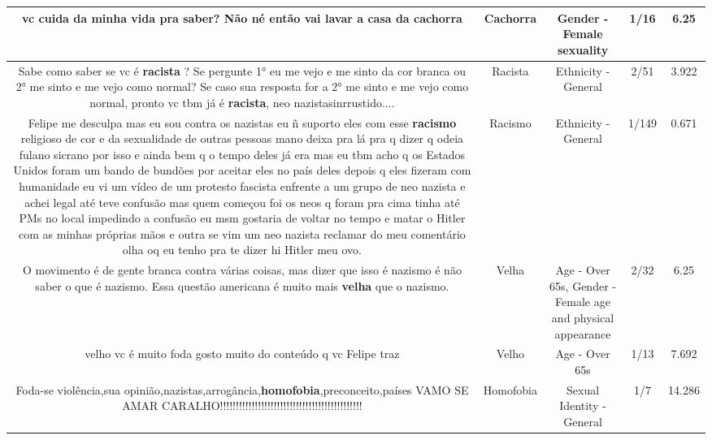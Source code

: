 \documentclass[11pt]{article}
\newlength\mylength
\begin{document}
\begin{center}
\begin{longtable}{|C{.65\mylength}|C{.30\mylength}|C{.12\mylength}|C{.12\mylength}|C{.12\mylength}|}
  \small vc cuida da minha vida pra saber? Não né então vai lavar a casa da cachorra\normalsize   & Cachorra & Gender - Female sexuality & 1/16 & 6.25 \\  \hline
  \small Sabe como saber se vc é \textbf{racista} ? Se pergunte 1° eu me vejo e me sinto da cor branca ou 2° me sinto e me vejo como normal? Se caso sua resposta for a 2° me sinto e me vejo como normal, pronto vc tbm já é \textbf{racista}, neo nazistasinrrustido....\normalsize   & Racista & Ethnicity - General & 2/51 & 3.922 \\  \hline
  \small Felipe me desculpa mas eu sou contra os nazistas eu ñ suporto eles com esse \textbf{racismo} religioso de cor e da sexualidade de outras pessoas mano deixa pra lá pra q dizer q odeia fulano sicrano por isso e ainda bem q o tempo deles já era mas eu tbm acho q os Estados Unidos foram um bando de bundões por aceitar eles no país deles depois q eles fizeram com humanidade eu vi um vídeo de um protesto fascista enfrente a um grupo de neo nazista e achei legal até teve confusão mas quem começou foi os neos q foram pra cima tinha até PMs no local impedindo a confusão eu msm gostaria de voltar no tempo e matar o Hitler com as minhas próprias mãos e outra se vim um neo nazista reclamar do meu comentário olha oq eu tenho pra te dizer hi Hitler meu ovo.\normalsize   & Racismo & Ethnicity - General & 1/149 & 0.671 \\  \hline
  \small O movimento é de gente branca contra várias coisas, mas dizer que isso é nazismo é não saber o que é nazismo. Essa questão americana é muito mais \textbf{v\textbf{elha}} que o nazismo.\normalsize   & Velha & Age - Over 65s, Gender - Female age and physical appearance & 2/32 & 6.25 \\  \hline
  \small velho vc é muito foda gosto muito do conteúdo q vc Felipe traz\normalsize   & Velho & Age - Over 65s & 1/13 & 7.692 \\  \hline
  \small Foda-se violência,sua opinião,nazistas,arrogância,\textbf{homofobia},preconceito,países VAMO SE AMAR CARALHO!!!!!!!!!!!!!!!!!!!!!!!!!!!!!!!!!!!!!!!!!!!!!\normalsize   & Homofobia & Sexual Identity - General & 1/7 & 14.286 \\  \hline

\end{longtable}
\end{center}
\end{document}
